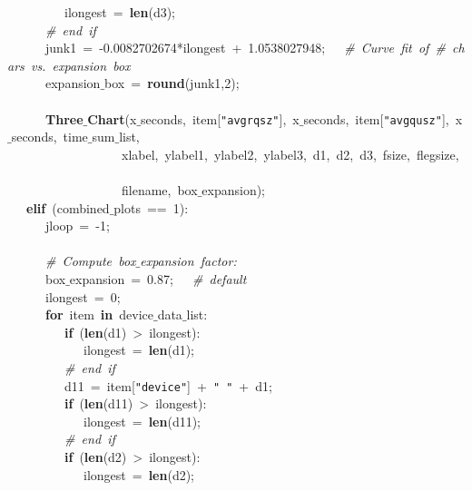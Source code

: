 \mbox{}\ \ \ \ \ \ \ \ \ ilongest\ =\ \textbf{len}(d3); \\
\mbox{}\ \ \ \ \ \ \textit{\#\ end\ if} \\
\mbox{}\ \ \ \ \ \ junk1\ =\ -0.0082702674*ilongest\ +\ 1.0538027948;\ \ \ \textit{\#\ Curve\ fit\ of\ \#\ chars\ vs.\ expansion\ box} \\
\mbox{}\ \ \ \ \ \ expansion$\_$box\ =\ \textbf{round}(junk1,2); \\
\mbox{}\ \ \ \ \ \  \\
\mbox{}\ \ \ \ \ \ \textbf{Three$\_$Chart}(x$\_$seconds,\ item[\texttt{"{}avgrqsz"{}}],\ x$\_$seconds,\ item[\texttt{"{}avgqusz"{}}],\ x$\_$seconds,\ time$\_$sum$\_$list, \\
\mbox{}\ \ \ \ \ \ \ \ \ \ \ \ \ \ \ \ \ \ xlabel,\ ylabel1,\ ylabel2,\ ylabel3,\ d1,\ d2,\ d3,\ fsize,\ flegsize,\  \\
\mbox{}\ \ \ \ \ \ \ \ \ \ \ \ \ \ \ \ \ \ filename,\ box$\_$expansion); \\
\mbox{}\ \ \ \textbf{elif}\ (combined$\_$plots\ ==\ 1): \\
\mbox{}\ \ \ \ \ \ jloop\ =\ -1; \\
\mbox{}\ \ \ \ \ \  \\
\mbox{}\ \ \ \ \ \ \textit{\#\ Compute\ box$\_$expansion\ factor:} \\
\mbox{}\ \ \ \ \ \ box$\_$expansion\ =\ 0.87;\ \ \ \textit{\#\ default} \\
\mbox{}\ \ \ \ \ \ ilongest\ =\ 0; \\
\mbox{}\ \ \ \ \ \ \textbf{for}\ item\ \textbf{in}\ device$\_$data$\_$list: \\
\mbox{}\ \ \ \ \ \ \ \ \ \textbf{if}\ (\textbf{len}(d1)\ \textgreater{}\ ilongest): \\
\mbox{}\ \ \ \ \ \ \ \ \ \ \ \ ilongest\ =\ \textbf{len}(d1); \\
\mbox{}\ \ \ \ \ \ \ \ \ \textit{\#\ end\ if} \\
\mbox{}\ \ \ \ \ \ \ \ \ d11\ =\ item[\texttt{"{}device"{}}]\ +\ \texttt{"{}\ "{}}\ +\ d1; \\
\mbox{}\ \ \ \ \ \ \ \ \ \textbf{if}\ (\textbf{len}(d11)\ \textgreater{}\ ilongest): \\
\mbox{}\ \ \ \ \ \ \ \ \ \ \ \ ilongest\ =\ \textbf{len}(d11); \\
\mbox{}\ \ \ \ \ \ \ \ \ \textit{\#\ end\ if} \\
\mbox{}\ \ \ \ \ \ \ \ \ \textbf{if}\ (\textbf{len}(d2)\ \textgreater{}\ ilongest): \\
\mbox{}\ \ \ \ \ \ \ \ \ \ \ \ ilongest\ =\ \textbf{len}(d2); \\
